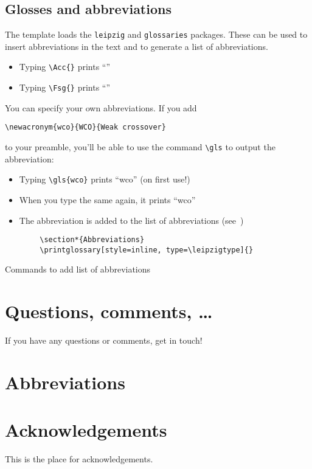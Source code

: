 \subsection{Glosses and abbreviations}\label{sub:glosses}

The template loads the \texttt{leipzig} and \texttt{glossaries} packages. These can
be used to insert abbreviations in the text and to generate a list of abbreviations.

\begin{itemize}
    \item Typing \verb+\Acc{}+ prints \enquote{\Acc}
    \item Typing \verb+\Fsg{}+ prints \enquote{\Fsg}
\end{itemize}

You can specify your own abbreviations. If you add

\begin{verbatim}
\newacronym{wco}{WCO}{Weak crossover}
\end{verbatim}

to your preamble, you'll be able to use the command \verb+\gls+ to output the
abbreviation:

\begin{itemize}
    \item Typing \verb+\gls{wco}+ prints \enquote{\gls{wco}} (on first use!)
    \item When you type the same again, it prints \enquote{\gls{wco}}
    \item The abbreviation is added to the list of abbreviations
    (see~)
\end{itemize}

\begin{listing}[ht]
    \begin{verbatim}
        \section*{Abbreviations}
        \printglossary[style=inline, type=\leipzigtype]{}
    \end{verbatim}
    \caption{Commands to add list of abbreviations}\label{lst:abbreviations}
\end{listing}

\section{Questions, comments, \dots{}}

If you have any questions or comments, get in touch!

\section*{Abbreviations}
\printglossary[style=inline, type=\leipzigtype]{}

\section*{Acknowledgements}

This is the place for acknowledgements.

\newrefcontext[sorting=nyt]
\printbibliography


